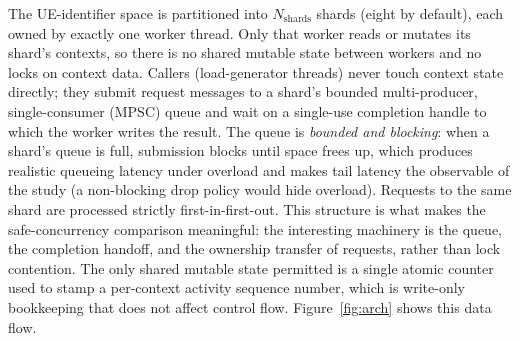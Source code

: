 \documentclass[english,twoside,openright,a4paper,censored,csm,software-track-2020]{HYthesisML}
\begin{document}
The UE-identifier space is partitioned into $N_{\text{shards}}$ shards (eight by default),
each owned by exactly one worker thread. Only that worker reads or mutates its shard's
contexts, so there is no shared mutable state between workers and no locks on context data.
Callers (load-generator threads) never touch context state directly; they submit request
messages to a shard's bounded multi-producer, single-consumer (MPSC) queue and wait on a
single-use completion handle to which the worker writes the result. The queue is
\emph{bounded and blocking}: when a shard's queue is full, submission blocks until space
frees up, which produces realistic queueing latency under overload and makes tail latency
the observable of the study (a non-blocking drop policy would hide overload). Requests to
the same shard are processed strictly first-in-first-out. This structure is what makes the
safe-concurrency comparison meaningful: the interesting machinery is the queue, the
completion handoff, and the ownership transfer of requests, rather than lock contention. The
only shared mutable state permitted is a single atomic counter used to stamp a per-context
activity sequence number, which is write-only bookkeeping that does not affect control flow.
Figure~\ref{fig:arch} shows this data flow.
\end{document}
